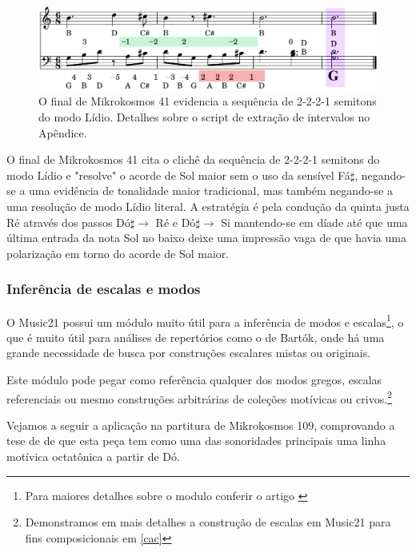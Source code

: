 \documentclass[
	12pt,				%
	openright,			%
	twoside,			%
	a4paper,			%
	english,			%
	french,				%
	spanish,			%
	brazil				%
	]{abntex2}
\begin{document}
\begin{figure}[!h]
	\caption{\label{fig_grafico}O final de Mikrokosmos 41 evidencia a sequência de 2-2-2-1 semitons do modo Lídio. Detalhes sobre o script de extração de intervalos no Apêndice. } 
	\begin{center}
	    \includegraphics[scale=0.3]{estudosM21/mikro041FinalChords_contorno.png}
	\end{center}
\end{figure}

O final de Mikrokosmos 41 cita o clichê da sequência de 2-2-2-1 semitons do modo Lídio e "resolve" o acorde de Sol maior sem o uso da sensível Fá$\sharp$, negando-se a uma evidência de tonalidade maior tradicional, mas também negando-se a uma resolução de modo Lídio literal. A estratégia é pela condução da quinta justa Ré através dos passos Dó$\sharp \rightarrow $ Ré e Dó$\sharp \rightarrow $ Si mantendo-se em díade até que uma última entrada da nota Sol no baixo deixe uma impressão vaga de que havia uma polarização em torno do acorde de Sol maior. 

\subsubsection{Inferência de escalas e modos}

O Music21 possui um módulo muito útil para a inferência de modos e escalas\footnote{Para maiores detalhes sobre o modulo conferir o artigo \cite{ariza2011analytical}}, o que é muito útil para análises de repertórios como o de Bartók, onde há uma grande necessidade de busca por construções escalares mistas ou originais.

Este módulo pode pegar como referência qualquer dos modos gregos, escalas referenciais ou mesmo construções arbitrárias de coleções motívicas ou crivos.\footnote{Demonstramos em mais detalhes a construção de escalas em Music21 para fins composicionais em \autoref{cac} }

Vejamos a seguir a aplicação na partitura de Mikrokosmos 109, comprovando a tese de  de que esta peça tem como uma das sonoridades principais uma linha motívica octatônica a partir de Dó.
\end{document}
